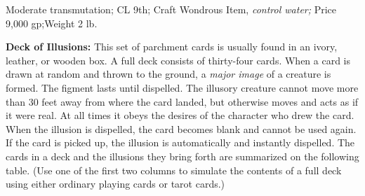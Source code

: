 \documentclass{article}
\begin{document}
Moderate transmutation; CL 9th; Craft Wondrous Item, \textit{control water; }Price 
9,000 gp;Weight 2 lb.

\textbf{Deck of Illusions:} This set of parchment cards is usually found in an 
ivory, leather, or wooden box. A full deck consists of thirty-four cards. When 
a card is drawn at random and thrown to the ground, a \textit{major image }of a 
creature is formed. The figment lasts until dispelled. The illusory creature cannot 
move more than 30 feet away from where the card landed, but otherwise moves and 
acts as if it were real. At all times it obeys the desires of the character who 
drew the card. When the illusion is dispelled, the card becomes blank and cannot 
be used again. If the card is picked up, the illusion is automatically and instantly 
dispelled. The cards in a deck and the illusions they bring forth are summarized 
on the following table. (Use one of the first two columns to simulate the contents 
of a full deck using either ordinary playing cards or tarot cards.)
\end{document}
